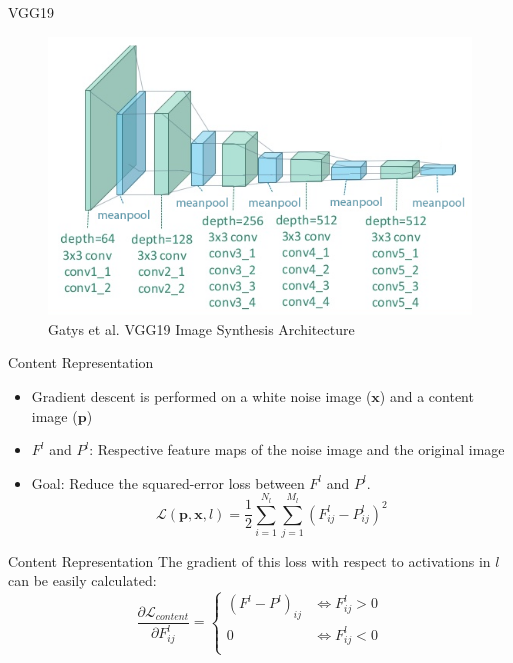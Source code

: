 \documentclass{beamer}
\begin{document}
\begin{frame}{VGG19}
\begin{figure}[H]
\centering
\includegraphics[width=.9\textwidth]{img/vgg19/synthesis}
\caption*{Gatys et al. VGG19 Image Synthesis Architecture}
\end{figure}
\end{frame}

\begin{frame}{Content Representation}
    \begin{itemize}
        \item Gradient descent is performed on a white noise image
            ($\mathbf{x}$) and a content image
            ($\mathbf{p}$)
        \item $F^l$ and $P^l$: Respective feature maps of the
            noise image and the original image
        \item Goal: Reduce the squared-error loss between $F^l$ and $P^l$.
    \begin{equation}
        \mathcal{L}(\mathbf{p}, \mathbf{x}, l) =
        \frac{1}{2} \sum_{i=1}^{N_l}\sum_{j=1}^{M_l}{(F^l_{ij} - P^l_{ij})^2}
    \end{equation}
    \end{itemize}
\end{frame}

\begin{frame}{Content Representation}
    The gradient of this loss with respect to activations in $l$ can be easily
    calculated:
    \begin{equation}
        \frac{\partial \mathcal{L}_{content}}{\partial F^l_{ij}}
        =
        \begin{cases}
            (F^l - P^l)_{ij} & \iff F^l_{ij} > 0 \\
            0 & \iff F^l_{ij} < 0 \\
        \end{cases}
    \end{equation}
\end{frame}
\end{document}
